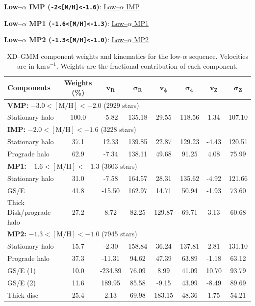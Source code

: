 \documentclass[a4paper,12pt]{article}
\begin{document}
\noindent\textbf{Low–$\alpha$ IMP (\texttt{-2<[M/H]<-1.6})}:  
\href{https://raw.githack.com/raunaq-rai/Disentangling-the-Milky-Way-using-GMM/main/figures/IMP_low____-2%5BM_H%5D-1.6.html}{Low–$\alpha$ IMP}

\noindent\textbf{Low–$\alpha$ MP1 (\texttt{-1.6<[M/H]<-1.3})}:  
\href{https://raw.githack.com/raunaq-rai/Disentangling-the-Milky-Way-using-GMM/main/figures/MP1_low____-1.6%5BM_H%5D-1.3.html}{Low–$\alpha$ MP1}

\noindent\textbf{Low–$\alpha$ MP2 (\texttt{-1.3<[M/H]<-1.0})}:  
\href{https://raw.githack.com/raunaq-rai/Disentangling-the-Milky-Way-using-GMM/main/figures/MP2_low____-1.3%5BM_H%5D-1.0.html}{Low–$\alpha$ MP2}

\begin{table}[H]
\centering
\begin{tabular}{lccccccc}
\hline
\textbf{Components} & \textbf{Weights (\%)} & $\mathbf{v_R}$ & $\boldsymbol{\sigma_R}$ & $\mathbf{v_\phi}$ & $\boldsymbol{\sigma_\phi}$ & $\mathbf{v_Z}$ & $\boldsymbol{\sigma_Z}$ \\
\hline
\multicolumn{8}{l}{\textbf{VMP:} $-3.0 < \mathrm{[M/H]} < -2.0$ (2929 stars)} \\
Stationary halo     & 100.0 &  -5.82 & 135.18 &  29.55 & 118.56 &  1.34 & 107.10 \\
\hline
\multicolumn{8}{l}{\textbf{IMP:} $-2.0 < \mathrm{[M/H]} < -1.6$ (3228 stars)} \\
Stationary halo     &  37.1 &  12.33 & 139.85 &  22.87 & 129.23 & -4.43 & 120.51 \\
Prograde halo       &  62.9 &  -7.34 & 138.11 &  49.68 &  91.25 &  4.08 &  75.99 \\
\hline
\multicolumn{8}{l}{\textbf{MP1:} $-1.6 < \mathrm{[M/H]} < -1.3$ (3603 stars)} \\
Stationary halo     &  31.0 &  -7.58 & 164.57 &  28.31 & 135.62 & -4.92 & 121.66 \\
GS/E                &  41.8 & -15.50 & 162.97 &  14.71 &  50.94 & -1.93 &  73.60 \\
Thick Disk/prograde halo   &  27.2 &   8.72 &  82.25 & 129.87 &  69.71 &  3.13 &  60.68 \\
\hline
\multicolumn{8}{l}{\textbf{MP2:} $-1.3 < \mathrm{[M/H]} < -1.0$ (7945 stars)} \\
Stationary halo     &  15.7 &  -2.30 & 158.84 &  36.24 & 137.81 &  2.81 & 131.10 \\
Prograde halo       &  37.3 & -11.31 &  94.62 &  47.39 &  63.89 & -1.18 &  63.12 \\
GS/E (1)            &  10.0 &-234.89 &  76.09 &   8.99 &  41.09 & 10.70 &  93.79 \\
GS/E (2)            &  11.6 & 189.95 &  85.58 &  -9.15 &  43.99 & -8.49 &  89.69 \\
Thick disc          &  25.4 &   2.13 &  69.98 & 183.15 &  48.36 &  1.75 &  54.21 \\
\hline
\end{tabular}
\caption{XD--GMM component weights and kinematics for the low-$\alpha$ sequence.  
         Velocities are in km\,s$^{-1}$. Weights are the fractional contribution of each component.}
\label{tab:gmm_lowa_stats}
\end{table}
\end{document}
